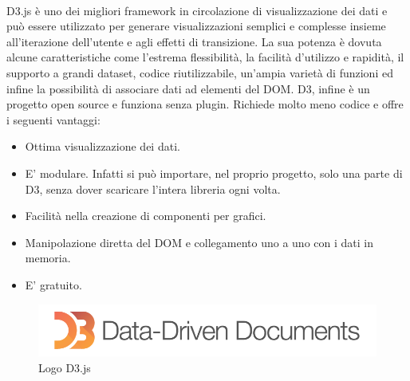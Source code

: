 \\D3.js è uno dei migliori framework in circolazione di visualizzazione dei dati e può essere utilizzato per generare visualizzazioni semplici e complesse insieme all'iterazione dell'utente e agli effetti di transizione. La sua potenza è dovuta alcune caratteristiche come l'estrema flessibilità, la facilità d'utilizzo e rapidità, il supporto a grandi dataset, codice riutilizzabile, un'ampia varietà di funzioni ed infine la possibilità di associare dati ad elementi del DOM. D3, infine è un progetto open source e funziona senza plugin. Richiede molto meno codice e offre i seguenti vantaggi:
\begin{itemize}
\item Ottima visualizzazione dei dati.
\item E' modulare. Infatti si può importare, nel proprio progetto, solo una parte di D3, senza dover scaricare l'intera libreria ogni volta.
\item Facilità nella creazione di componenti per grafici.
\item Manipolazione diretta del DOM e collegamento uno a uno con i dati in memoria.
\item E' gratuito.
\end{itemize}
\begin{figure}[H]
	\centering
	\includegraphics[width=\textwidth]{images/d3Logo.png}
	\caption{Logo D3.js}
	\label{fig:d3Logo}
\end{figure}